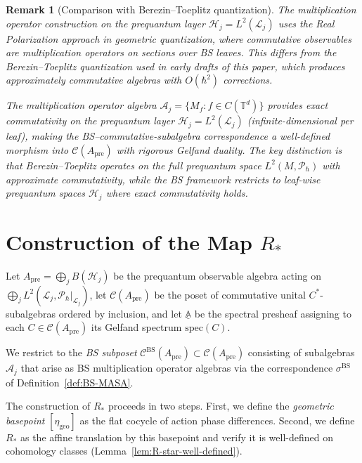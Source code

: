 \documentclass[11pt]{article}
\newtheorem{remark}[theorem]{Remark}
\begin{document}
\begin{remark}[Comparison with Berezin--Toeplitz quantization]
\label{rem:BT-comparison}
The multiplication operator construction on the prequantum layer
$\mathcal{H}_j = L^2(\mathcal{L}_j)$ uses the Real Polarization approach
in geometric quantization, where commutative observables are multiplication
operators on sections over BS leaves. This differs from the
Berezin--Toeplitz quantization used in early drafts of this paper,
which produces approximately commutative algebras with $O(\hbar^2)$ corrections.

The multiplication operator algebra $\mathcal{A}_j = \{M_f : f \in C(\mathbb{T}^d)\}$
provides \emph{exact} commutativity on the prequantum layer $\mathcal{H}_j = L^2(\mathcal{L}_j)$
(infinite-dimensional per leaf), making the BS--commutative-subalgebra correspondence
a well-defined morphism into $\mathcal{C}(A_{\mathrm{pre}})$ with rigorous Gelfand duality.
The key distinction is that Berezin--Toeplitz operates on the full prequantum space
$L^2(M, \mathcal{P}_\hbar)$ with approximate commutativity, while the BS framework
restricts to leaf-wise prequantum spaces $\mathcal{H}_j$ where exact commutativity holds.
\end{remark}

\section{Construction of the Map $R_*$}
\label{sec:R-star}

Let $A_{\mathrm{pre}} = \bigoplus_j B(\mathcal{H}_j)$ be the prequantum
observable algebra acting on $\bigoplus_j L^2(\mathcal{L}_j, \mathcal{P}_\hbar|_{\mathcal{L}_j})$,
let $\mathcal{C}(A_{\mathrm{pre}})$ be the poset of commutative
unital $C^*$-subalgebras ordered by inclusion, and let
$\underline{\mathbb{A}}$ be the spectral presheaf assigning to each
$C \in \mathcal{C}(A_{\mathrm{pre}})$ its Gelfand spectrum $\mathrm{spec}(C)$.

We restrict to the \emph{BS subposet}
$\mathcal{C}^{\mathrm{BS}}(A_{\mathrm{pre}}) \subset \mathcal{C}(A_{\mathrm{pre}})$ consisting of
subalgebras $\mathcal{A}_j$ that arise as BS multiplication operator algebras via the
correspondence $\sigma^{\mathrm{BS}}$ of Definition~\ref{def:BS-MASA}.

The construction of $R_*$ proceeds in two steps. First, we define the
\emph{geometric basepoint} $[\eta_{\mathrm{geo}}]$ as the flat cocycle
of action phase differences. Second, we define $R_*$ as the affine translation
by this basepoint and verify it is well-defined on cohomology classes
(Lemma~\ref{lem:R-star-well-defined}).
\end{document}
